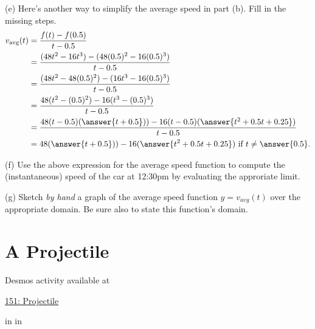 \documentclass{ximera}
\newcommand{\pskip}{\vskip 0.1 in}
\begin{document}
\begin{example}
\begin{question}
(e) Here's another way to simplify the average speed in part (b). Fill in the missing steps.
\begin{align*}
   v_{\text{avg}}(t) &= \frac{f(t) - f(0.5)}{t - 0.5} \\
                        &= \frac{(48t^2 - 16t^3) - (48(0.5)^2 -16(0.5)^3)}{t-0.5} \\
                        &= \frac{(48t^2 - 48(0.5)^2) - (16t^3 -16(0.5)^3) }{t-0.5} \\
                        &= \frac{48(t^2 - (0.5)^2) - 16(t^3 -(0.5)^3) }{t-0.5} \\
                       &= \frac{48(t-0.5)(\answer{t+0.5})) - 16(t-0.5)(\answer{t^2 + 0.5 t + 0.25}) }{t-0.5} \\
                       &=  48(\answer{t+0.5})) - 16(\answer{t^2 + 0.5 t + 0.25})  \text{ if } t\neq \answer{0.5}.
\end{align*}

(f) Use the above expression for the average speed function to compute the (instantaneous) speed of the car at 12:30pm by evaluating the approriate limit.

(g) Sketch \emph{by hand} a graph of the average speed function $y=v_{avg}(t)$ over the appropriate domain. Be sure also to state this function's domain. 

\end{question}
\end{example}


\section{A Projectile}

\begin{example}   \label{Ex4erxde}


 
\begin{onlineOnly}
    \begin{center}
\end{center}
\end{onlineOnly}

Desmos activity available at

\href{https://www.desmos.com/calculator/l4fknr0hpl}{151: Projectile}

\pskip \pskip


\end{example}
\end{document}
